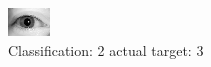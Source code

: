 \begin{figure}[h!]
\begin{center}
\includegraphics[width=0.60\columnwidth]{figures/ID3098_class_2_target_3.png}
\end{center}
\caption{ Classification: 2 actual target: 3}
\label{fig:ID3098_class_2_target_3}
\end{figure}
